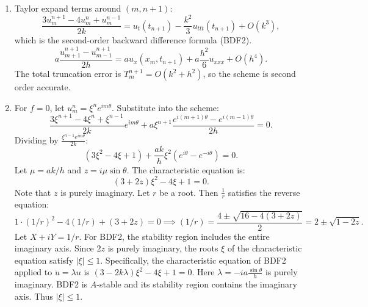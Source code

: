 \begin{solution}
\begin{enumerate}
    \item Taylor expand terms around $(m, n+1)$:
    \[
    \frac{3u_m^{n+1} - 4u_m^n + u_m^{n-1}}{2k} = u_t(t_{n+1}) - \frac{k^2}{3} u_{ttt}(t_{n+1}) + O(k^3),
    \]
    which is the second-order backward difference formula (BDF2).
    \[
    a \frac{u_{m+1}^{n+1} - u_{m-1}^{n+1}}{2h} = a u_x(x_m, t_{n+1}) + a \frac{h^2}{6} u_{xxx} + O(h^4).
    \]
    The total truncation error is $T_m^{n+1} = O(k^2 + h^2)$, so the scheme is second order accurate.
    \item For $f=0$, let $u_m^n = \xi^n e^{im\theta}$. Substitute into the scheme:
    \[
    \frac{3\xi^{n+1} - 4\xi^n + \xi^{n-1}}{2k} e^{im\theta} + a \xi^{n+1} \frac{e^{i(m+1)\theta} - e^{i(m-1)\theta}}{2h} = 0.
    \]
    Dividing by $\frac{\xi^{n-1} e^{im\theta}}{2k}$:
    \[
    (3\xi^2 - 4\xi + 1) + \frac{ak}{h} \xi^2 (e^{i\theta} - e^{-i\theta}) = 0.
    \]
    Let $\mu = ak/h$ and $z = i \mu \sin\theta$. The characteristic equation is:
    \[
    (3 + 2z) \xi^2 - 4\xi + 1 = 0.
    \]
    Note that $z$ is purely imaginary. Let $r$ be a root. Then $\frac{1}{r}$ satisfies the reverse equation:
    \[
    1 \cdot (1/r)^2 - 4(1/r) + (3+2z) = 0 \implies (1/r) = \frac{4 \pm \sqrt{16-4(3+2z)}}{2} = 2 \pm \sqrt{1-2z}.
    \]
    Let $X+iY = 1/r$. For BDF2, the stability region includes the entire imaginary axis. Since $2z$ is purely imaginary, the roots $\xi$ of the characteristic equation satisfy $|\xi| \leq 1$.
    Specifically, the characteristic equation of BDF2 applied to $\dot{u} = \lambda u$ is $(3-2k\lambda)\xi^2 - 4\xi + 1 = 0$. Here $\lambda = -ia \frac{\sin\theta}{h}$ is purely imaginary. BDF2 is $A$-stable and its stability region contains the imaginary axis. Thus $|\xi| \leq 1$.
\end{enumerate}
\end{solution}

